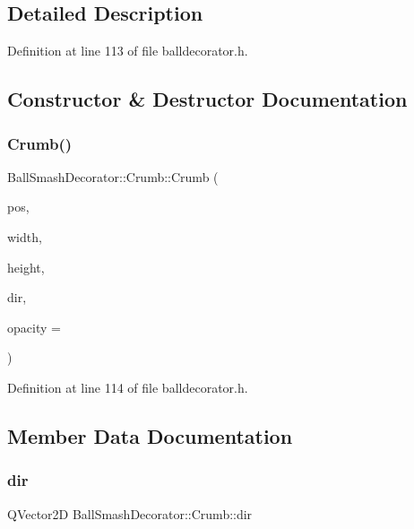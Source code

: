 \subsection{Detailed Description}


Definition at line 113 of file balldecorator.\+h.



\subsection{Constructor \& Destructor Documentation}
\mbox{\label{struct_ball_smash_decorator_1_1_crumb_a56aecb399208100c5949fd769841c471}} 
\subsubsection{\texorpdfstring{Crumb()}{Crumb()}}
{\footnotesize\ttfamily Ball\+Smash\+Decorator\+::\+Crumb\+::\+Crumb (\begin{DoxyParamCaption}\item[{Q\+PointF}]{pos,  }\item[{double}]{width,  }\item[{double}]{height,  }\item[{Q\+Vector2D}]{dir,  }\item[{double}]{opacity = {} }\end{DoxyParamCaption})\hspace{0.3cm}{\ttfamily [inline]}}



Definition at line 114 of file balldecorator.\+h.



\subsection{Member Data Documentation}
\mbox{\label{struct_ball_smash_decorator_1_1_crumb_aae0338b32f39f2afafdc80796591fe24}} 
\subsubsection{\texorpdfstring{dir}{dir}}
{\footnotesize\ttfamily Q\+Vector2D Ball\+Smash\+Decorator\+::\+Crumb\+::dir}



